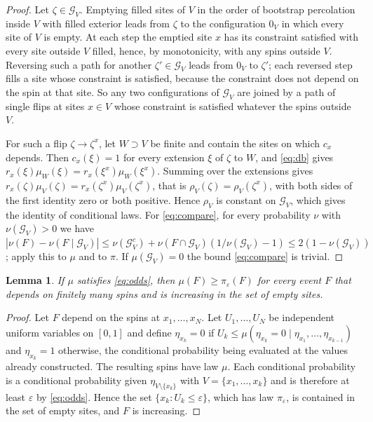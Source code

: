 \documentclass[11pt]{amsart}
\newtheorem{lemma}[theorem]{Lemma}
\theoremstyle{remark}
\begin{document}
\begin{proof}
Let $\zeta\in\mathcal G_V$. Emptying filled sites of $V$ in the order of bootstrap percolation inside $V$ with filled
exterior leads from $\zeta$ to the configuration $0_V$ in which every site of $V$ is empty. At each step the emptied
site $x$ has its constraint satisfied with every site outside $V$ filled, hence, by monotonicity, with any spins
outside $V$. Reversing such a path for another $\zeta'\in\mathcal G_V$ leads from $0_V$ to $\zeta'$; each reversed step
fills a site whose constraint is satisfied, because the constraint does not depend on the spin at that site. So any two
configurations of $\mathcal G_V$ are joined by a path of single flips at sites $x\in V$ whose constraint is satisfied
whatever the spins outside $V$.

For such a flip $\zeta\to\zeta^x$, let $W\supset V$ be finite and contain the sites on which $c_x$ depends. Then
$c_x(\xi)=1$ for every extension $\xi$ of $\zeta$ to $W$, and \eqref{eq:db} gives $r_x(\xi)\mu_W(\xi)=r_x(\xi^x)\mu_W(\xi^x)$.
Summing over the extensions gives $r_x(\zeta)\mu_V(\zeta)=r_x(\zeta^x)\mu_V(\zeta^x)$, that is
$\rho_V(\zeta)=\rho_V(\zeta^x)$, with both sides of the first identity zero or both positive. Hence $\rho_V$ is constant on
$\mathcal G_V$, which gives the identity of conditional laws. For \eqref{eq:compare}, for every probability $\nu$ with
$\nu(\mathcal G_V)>0$ we have $|\nu(F)-\nu(F\mid\mathcal G_V)|\le\nu(\mathcal G_V^c)+\nu(F\cap\mathcal
G_V)(1/\nu(\mathcal G_V)-1)\le2(1-\nu(\mathcal G_V))$; apply this to $\mu$ and to $\pi$. If $\mu(\mathcal G_V)=0$ the
bound \eqref{eq:compare} is trivial.
\end{proof}

\begin{lemma}\label{lem:domination}
If $\mu$ satisfies \eqref{eq:odds}, then $\mu(F)\ge\pi_\varepsilon(F)$ for every event $F$ that depends on finitely
many spins and is increasing in the set of empty sites.
\end{lemma}

\begin{proof}
Let $F$ depend on the spins at $x_1,\dots,x_N$. Let $U_1,\dots,U_N$ be independent uniform variables on $[0,1]$ and
define $\eta_{x_k}=0$ if $U_k\le\mu(\eta_{x_k}=0\mid\eta_{x_1},\dots,\eta_{x_{k-1}})$ and $\eta_{x_k}=1$ otherwise, the
conditional probability being evaluated at the values already constructed. The resulting spins have law
$\mu$. Each conditional probability is a conditional probability given $\eta_{V\setminus\{x_k\}}$ with
$V=\{x_1,\dots,x_k\}$ and is therefore at least $\varepsilon$ by \eqref{eq:odds}. Hence the set $\{x_k:U_k\le\varepsilon\}$, which has
law $\pi_\varepsilon$, is contained in the set of empty sites, and $F$ is increasing.
\end{proof}
\end{document}
